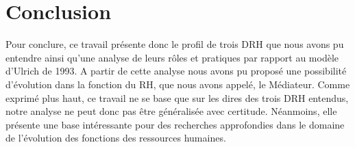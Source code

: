 \section*{Conclusion}

Pour conclure, ce travail présente donc le profil de trois DRH que nous avons pu entendre ainsi qu'une analyse de leurs rôles et pratiques par rapport au modèle d'Ulrich de 1993. A partir de cette analyse nous avons pu proposé une possibilité d'évolution dans la fonction du RH, que nous avons appelé, le \og{}Médiateur\fg{}.\newline
Comme exprimé plus haut, ce travail ne se base que sur les dires des trois DRH entendus, notre analyse ne peut donc pas être généralisée avec certitude. Néanmoins, elle présente une base intéressante pour des recherches approfondies dans le domaine de l'évolution des fonctions des ressources humaines.